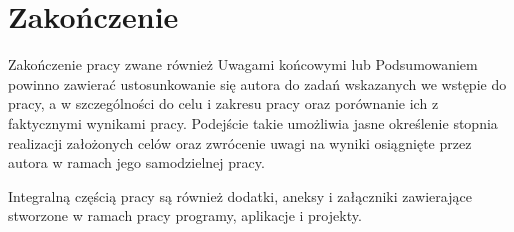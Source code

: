
\chapter{Zakończenie}

Zakończenie pracy zwane również Uwagami końcowymi lub Podsumowaniem powinno zawierać ustosunkowanie
się autora do zadań wskazanych we wstępie do pracy, a w szczególności do celu i zakresu pracy oraz
porównanie ich z faktycznymi wynikami pracy. Podejście takie umożliwia jasne określenie stopnia
realizacji założonych celów oraz zwrócenie uwagi na wyniki osiągnięte przez autora w ramach jego
samodzielnej pracy.

Integralną częścią pracy są również dodatki, aneksy i załączniki zawierające stworzone w ramach pracy programy, aplikacje i projekty.

